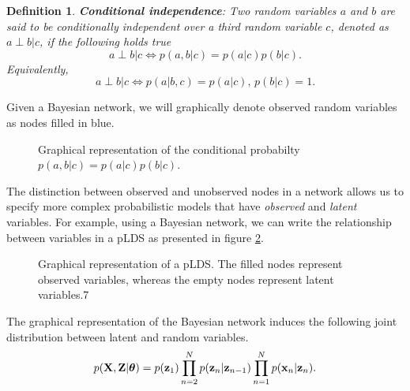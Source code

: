 \documentclass[11pt]{article}
\numberwithin{equation}{section}
\newcommand{\x}{{\bf x}}
\newcommand{\z}{{\bf z}}
\newtheorem{definition}{Definition}[section]
\begin{document}
\begin{definition}
	\textbf{Conditional independence}: Two random variables $a$ and $b$ are said to be conditionally independent over a third random variable $c$, denoted as $a \perp b \vert c$, if the following holds true
	\begin{equation}
		a \perp b \vert c \iff p(a, b \vert c) = p(a \vert c) p(b \vert c).
	\end{equation}
	Equivalently,
	\begin{equation}
		a \perp b \vert c \iff p(a \vert b, c) = p(a \vert c) \text{, } p(b \vert c) = 1.
	\end{equation}
\end{definition}

Given a Bayesian network, we will graphically denote observed random variables as nodes filled in blue. 

\begin{figure}[h!]
	\centering
	
	\caption{Graphical representation of the conditional probabilty $p(a, b\vert c) = p(a \vert c) p(b \vert c)$.}
	\label{fig:bayes-net-3}
\end{figure}


The distinction between observed and unobserved nodes in a network allows us to specify more complex probabilistic models that have \textit{observed} and \textit{latent} variables. For example, using a Bayesian network, we can write the relationship between variables in a pLDS as presented in figure \ref{fig:lds-gm}.

\begin{figure}[h!]
	\centering
	
	\caption{Graphical representation of a pLDS. The filled nodes represent observed variables, whereas the empty nodes represent latent variables.7}
	\label{fig:lds-gm}
\end{figure}

The graphical representation of the Bayesian network induces the following joint distribution between latent and random variables.
\begin{equation}
	p({\bf X}, {\bf Z} \vert\boldsymbol\theta) = p(\z_1)\prod_{n=2}^N p(\z_n\vert \z_{n-1})\prod_{n=1}^N p(\x_n\vert \z_n).
\end{equation}
\end{document}
